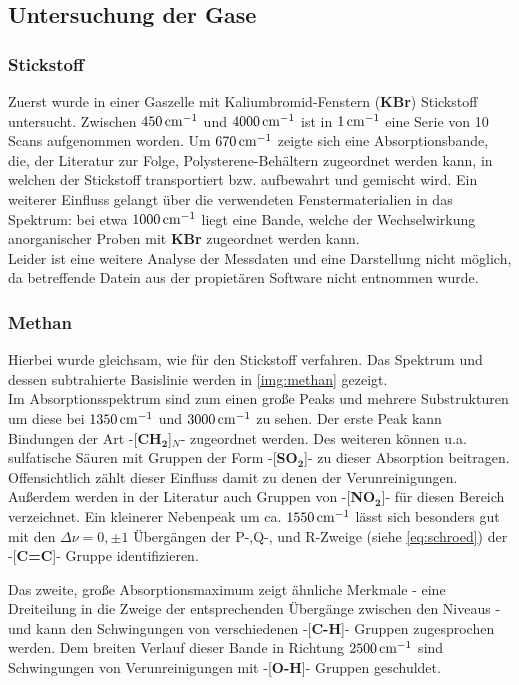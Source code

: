 \documentclass[a4paper,10pt,twocolumn]{article}
\newcommand{\fett}[1]{\textbf{#1}}
\begin{document}
		\subsection{Untersuchung der Gase}

		\subsubsection*{Stickstoff}
		Zuerst wurde in einer Gaszelle mit Kaliumbromid-Fenstern (\fett{KBr}) Stickstoff untersucht. Zwischen $\unit[450]{cm^{-1}}$ und $\unit[4000]{cm^{-1}}$ ist in $\unit[1]{cm^{-1}}$ eine Serie von 10 Scans aufgenommen worden. Um $\unit[670]{cm^{-1}}$ zeigte sich eine Absorptionsbande, die, der Literatur zur Folge, Polysterene-Beh\"altern zugeordnet werden kann, in welchen der Stickstoff transportiert bzw. aufbewahrt und gemischt wird. Ein weiterer Einfluss gelangt \"uber die verwendeten Fenstermaterialien in das Spektrum: bei etwa $\unit[1000]{cm^{-1}}$  liegt eine Bande, welche der Wechselwirkung anorganischer Proben mit \fett{KBr} zugeordnet werden kann.\\
		Leider ist eine weitere Analyse der Messdaten und eine Darstellung nicht m\"oglich, da betreffende Datein aus der propiet\"aren Software nicht entnommen wurde.
		
		\subsubsection*{Methan}
		Hierbei wurde gleichsam, wie f\"ur den Stickstoff verfahren. Das Spektrum und dessen subtrahierte Basislinie werden in \autoref{img:methan} gezeigt.\\
		Im Absorptionsspektrum sind zum einen gro{\ss}e Peaks und mehrere Substrukturen um diese bei $\unit[1350]{cm^{-1}}$ und $\unit[3000]{cm^{-1}}$ zu sehen. Der erste Peak kann Bindungen der Art -[\fett{CH}$_{\fett{2}}$]$_{N}$- zugeordnet werden. Des weiteren k\"onnen  u.a. sulfatische S\"auren mit Gruppen der Form -[\fett{SO}$_{\fett{2}}$]- zu dieser Absorption beitragen. Offensichtlich z\"ahlt dieser Einfluss damit zu denen der Verunreinigungen. Au{\ss}erdem werden in der Literatur auch Gruppen von -[\fett{NO}$_{\fett{2}}$]- f\"ur diesen Bereich verzeichnet. Ein kleinerer Nebenpeak um ca. $\unit[1550]{cm^{-1}}$ l\"asst sich besonders gut mit den $\Delta\nu=0,\pm1$ \"Uberg\"angen der P-,Q-, und R-Zweige (siehe \autoref{eq:schroed}) der -[\fett{C=C}]- Gruppe identifizieren.

	\newpage

		Das zweite, gro{\ss}e Absorptionsmaximum zeigt \"ahnliche Merkmale - eine Dreiteilung in die Zweige der entsprechenden \"Uberg\"ange zwischen den Niveaus - und kann den Schwingungen von verschiedenen -[\fett{C-H}]- Gruppen zugesprochen werden. Dem breiten Verlauf dieser Bande in Richtung $\unit[2500]{cm^{-1}}$ sind Schwingungen von Verunreinigungen mit -[\fett{O-H}]- Gruppen geschuldet.
\end{document}

